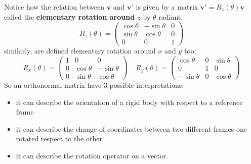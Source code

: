 \documentclass[10pt, letterpaper]{report}
\begin{document}
Notice how the relation between $\mathbf v$ and $\mathbf v'$ is given by a matrix $ \mathbf v'=R_z(\theta)\mathbf v$ called the \textbf{elementary rotation around $z$} by $\theta$ radiant.\begin{equation}
    R_z(\theta) =\begin{pmatrix}
        \cos\theta & -\sin\theta&0\\
        \sin\theta&\cos\theta&0\\
        0&0&1
    \end{pmatrix} 
\end{equation}
similarly, are defined elementary rotation around $x$ and $y$ too:\begin{equation}
     R_x(\theta) =\begin{pmatrix}
        1&0&0\\
        0&\cos\theta & -\sin\theta\\
        0&\sin\theta&\cos\theta
    \end{pmatrix}  \ \ \ \ \  
    R_y(\theta) =\begin{pmatrix}
        \cos\theta&0&\sin\theta\\ 0&1&0\\ -\sin\theta&0&\cos\theta
    \end{pmatrix} 
\end{equation}
So an orthonormal matrix have 3 possible interpretations:\begin{itemize}
    \item it can describe the orientation of a rigid body with respect to a reference frame
    \item it can describe the change of coordinates between two different frames one rotated respect to the other
    \item it can describe the rotation operator on a vector.
\end{itemize}
\end{document}

